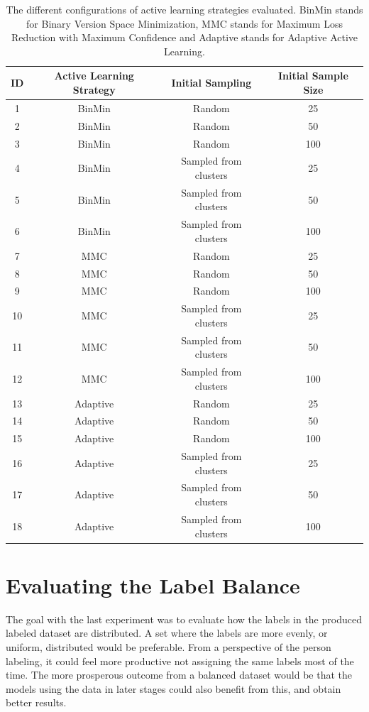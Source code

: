 \begin{table}
    \centering
    \begin{tabular}{|cccc|}
        \hline
        \textbf{ID} & \textbf{Active Learning Strategy} & \textbf{Initial Sampling} & \textbf{Initial Sample Size}\\
        \hline
        1 & BinMin & Random & 25\\
        2 & BinMin & Random & 50\\
        3 & BinMin & Random & 100\\
        4 & BinMin & Sampled from clusters & 25\\
        5 & BinMin & Sampled from clusters & 50\\
        6 & BinMin & Sampled from clusters & 100\\
        7 & MMC & Random & 25\\
        8 & MMC & Random & 50\\
        9 & MMC & Random & 100\\
        10 & MMC & Sampled from clusters & 25\\
        11 & MMC & Sampled from clusters & 50\\
        12 & MMC & Sampled from clusters & 100\\
        13 & Adaptive & Random & 25\\
        14 & Adaptive & Random & 50\\
        15 & Adaptive & Random & 100\\
        16 & Adaptive & Sampled from clusters & 25\\
        17 & Adaptive & Sampled from clusters & 50\\
        18 & Adaptive & Sampled from clusters & 100\\
        \hline
    \end{tabular}
    \caption{The different configurations of active learning strategies evaluated. BinMin stands for Binary Version Space Minimization, MMC stands for Maximum Loss Reduction with Maximum Confidence and Adaptive stands for Adaptive Active Learning.}
    \label{fig:active-learning-configurations}
\end{table}

\section{Evaluating the Label Balance}
The goal with the last experiment was to evaluate how the labels in the produced labeled dataset are distributed.
A set where the labels are more evenly, or uniform, distributed would be preferable.
From a perspective of the person labeling, it could feel more productive not assigning the same labels most of the time.
The more prosperous outcome from a balanced dataset would be that the models using the data in later stages could also benefit from this, and obtain better results.

